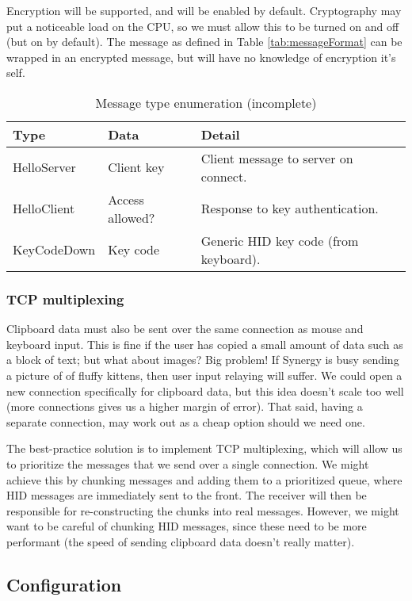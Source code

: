 Encryption will be supported, and will be enabled by default. Cryptography may 
put a noticeable load on the CPU, so we must allow this to be turned on and off
(but on by default). The message as defined in Table \ref{tab:messageFormat}
can be wrapped in an encrypted message, but will have no knowledge of encryption
it's self.

\begin{table}[ht!]
  \begin{tabular}{|l|l|l|}
    \hline
    \textbf{Type} &
    \textbf{Data} &
    \textbf{Detail} \\
    \hline
    HelloServer & Client key & Client message to server on connect. \\
    HelloClient & Access allowed? & Response to key authentication. \\
    KeyCodeDown & Key code & Generic HID key code (from keyboard). \\
    \hline
  \end{tabular}
  \caption{Message type enumeration (incomplete)}
  \label{tab:messageTypes}
\end{table}

\subsubsection{TCP multiplexing}

Clipboard data must also be sent over the same connection as mouse and
keyboard input. This is fine if the user has copied a small amount of data
such as a block of text; but what about images? Big problem! If Synergy is busy
sending a picture of of fluffy kittens, then user input relaying will suffer.
We could open a new connection specifically for clipboard data, but this idea
doesn't scale too well (more connections gives us a higher margin of error).
That said, having a separate connection, may work out as a cheap option
should we need one.

The best-practice solution is to implement TCP multiplexing, which will allow 
us to prioritize the messages that we send over a single connection. We
might achieve this by chunking messages and adding them to a prioritized queue,
where HID messages are immediately sent to the front. The receiver will then
be responsible for re-constructing the chunks into real messages. However,
we might want to be careful of chunking HID messages, since these need to be
more performant (the speed of sending clipboard data doesn't really matter).

\subsection{Configuration}


